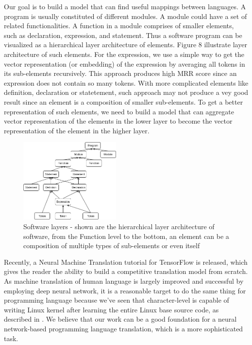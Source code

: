 Our goal is to build a model that can find useful mappings between languages. A program is usually constituted of different modules. A module could have a set of related functionalities. A function in a module comprises of smaller elements, such as declaration, expression, and statement. Thus a software program can be visualized as a hierarchical layer architecture of elements. Figure 8 illustrate layer architecture of such elements. For the expression, we use a simple way to get the vector representation (or embedding) of the expression by averaging all tokens in its sub-elements recursively. This approach produces high MRR score since an expression does not contain so many tokens. With more complicated elements like definition, declaration or statetement, such approach may not produce a vey good result since an element is a composition of smaller sub-elements. To get a better representation of such elements, we need to build a model that can aggregate vector representation of the elements in the lower layer to become the vector representation of the element in the higher layer. 

\begin{figure}[t!]
	\includegraphics[width=0.45\textwidth]{software_layers}
	\caption{Software layers - shown are the hierarchical layer architecture of software, from the Function level to the bottom, an element can be a composition of multiple types of sub-elements or even itself}
	\medskip
	\label{fig:clf}
\end{figure}

Recently, a Neural Machine Translation tutorial \cite{Thang} for TensorFlow is released, which gives the reader the ability to build a competitive translation model from scratch. As machine translation of human language is largely improved and successful by employing deep neural network, it is a reasonable target to do the same thing for programming language because we've seen that character-level is capable of writing Linux kernel after learning the entire Linux base source code, as described in \cite{Karpathy}. We believe that our work can be a good foundation for a neural network-based programming language translation, which is a more sophisticated task. 

